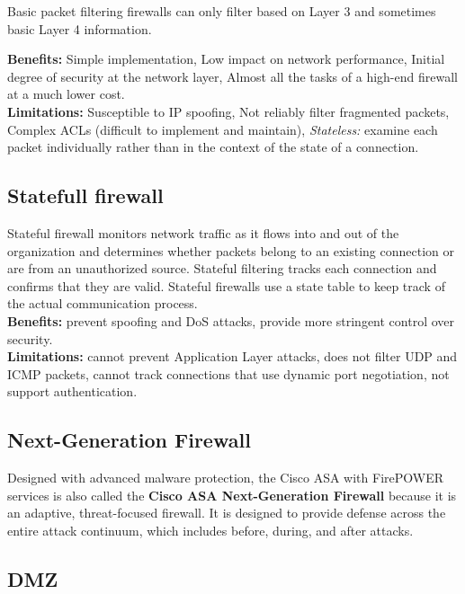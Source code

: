 Basic packet filtering firewalls can only filter based on Layer 3 and sometimes basic Layer 4 information. 

\textbf{Benefits:} Simple implementation, Low impact on network performance, Initial degree of security at the network layer, Almost all the tasks of a high-end firewall at a much lower cost.\\

\textbf{Limitations:} Susceptible to IP spoofing, Not reliably filter fragmented packets, Complex ACLs (difficult to implement and maintain), \emph{Stateless:} examine each packet individually rather than in the context of the state of a connection.

\subsection{Statefull firewall}

Stateful firewall monitors network traffic as it flows into and out of the organization and determines whether packets belong to an existing connection or are from an unauthorized source. Stateful filtering tracks each connection and confirms that they are valid. Stateful firewalls use a state table to keep track of the actual communication process.\\ 

\textbf{Benefits:} prevent spoofing and DoS attacks, provide more stringent control over security.\\ 

\textbf{Limitations:} cannot prevent Application Layer attacks, does not filter UDP and ICMP packets, cannot track connections that use dynamic port negotiation, not support authentication.

\subsection{Next-Generation Firewall}

Designed with advanced malware protection, the Cisco ASA with FirePOWER services is also called the \textbf{Cisco ASA Next-Generation Firewall} because it is an adaptive, threat-focused firewall. It is designed to provide defense across the entire attack continuum, which includes before, during, and after attacks.

\subsection{DMZ}

